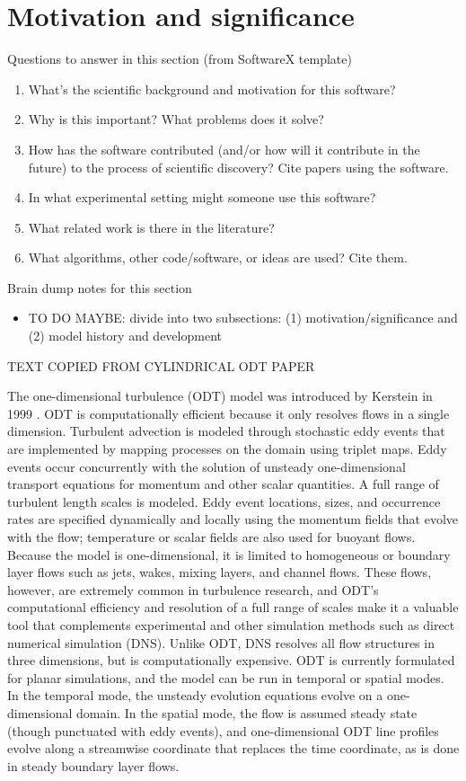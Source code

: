 \documentclass[preprint,12pt, a4paper]{elsarticle}
\begin{document}
\section{Motivation and significance}
\label{sec:motivation}

Questions to answer in this section (from SoftwareX template)
\begin{enumerate}
	\item What's the scientific background and motivation for this software?
	\item Why is this important? What problems does it solve?
	\item How has the software contributed (and/or how will it contribute in the future) to the process of scientific discovery? Cite papers using the software.
	\item In what experimental setting might someone use this software?
	\item What related work is there in the literature?
	\item What algorithms, other code/software, or ideas are used? Cite them. 
\end{enumerate}

Brain dump notes for this section
\begin{itemize}
	\item TO DO MAYBE: divide into two subsections: (1) motivation/significance and (2) model history and development
\end{itemize}

TEXT COPIED FROM CYLINDRICAL ODT PAPER

The one-dimensional turbulence (ODT) model was introduced by Kerstein in 1999 \cite{Kerstein_1999}. ODT is computationally efficient because it only resolves flows in a single dimension. Turbulent advection is modeled through stochastic eddy events that are implemented by mapping processes on the domain using triplet maps. Eddy events occur concurrently with the solution of unsteady one-dimensional transport equations for momentum and other scalar quantities. A full range of turbulent length scales is modeled. Eddy event locations, sizes, and occurrence rates are specified dynamically and locally using the momentum fields that evolve with the flow; temperature or scalar fields are also used for buoyant flows. Because the model is one-dimensional, it is limited to homogeneous or boundary layer flows such as jets, wakes, mixing layers, and channel flows. These flows, however, are extremely common in turbulence research, and ODT's computational efficiency and resolution of a full range of scales make it a valuable tool that complements experimental and other simulation methods such as direct numerical simulation (DNS). Unlike ODT, DNS resolves all flow structures in three dimensions, but is computationally expensive. ODT is currently formulated for planar simulations, and the model can be run in temporal or spatial modes. In the temporal mode, the unsteady evolution equations evolve on a one-dimensional domain. In the spatial mode, the flow is assumed steady state (though punctuated with eddy events), and one-dimensional ODT line profiles evolve along a streamwise coordinate that replaces the time coordinate, as is done in steady boundary layer flows.
\end{document}
